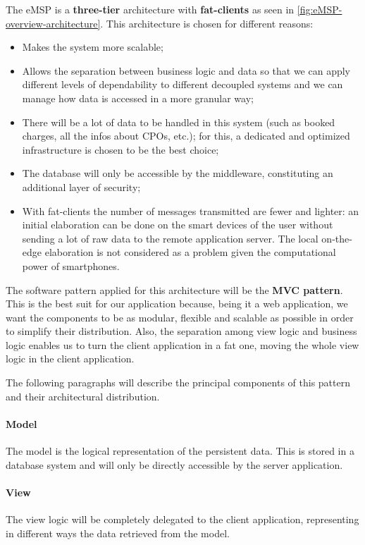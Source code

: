 The \ac{eMSP} is a \textbf{three-tier} architecture with \textbf{fat-clients} as seen in \autoref{fig:eMSP-overview-architecture}. This architecture is chosen for different reasons:
\begin{itemize}
    \item Makes the system more scalable;
    \item Allows the separation between business logic and data so that we can apply different levels of dependability to different decoupled systems and we can manage how data is accessed in a more granular way;
    \item There will be a lot of data to be handled in this system (such as booked charges, all the infos about \acp{CPO}, etc.); for this, a dedicated and optimized infrastructure is chosen to be the best choice;
    \item The database will only be accessible by the middleware, constituting an additional layer of security;
    \item With fat-clients the number of messages transmitted are fewer and lighter: an initial elaboration can be done on the smart devices of the user without sending a lot of raw data to the remote application server. The local on-the-edge elaboration is not considered as a problem given the computational power of smartphones.
\end{itemize}
The software pattern applied for this architecture will be the \textbf{\ac{MVC} pattern}. This is the best suit for our application because, being it a web application, we want the components to be as modular, flexible and scalable as possible in order to simplify their distribution.
Also, the separation among view logic and business logic enables us to turn the client application in a fat one, moving the whole view logic in the client application. 

The following paragraphs will describe the principal components of this pattern and their architectural distribution.

\paragraph{Model}
The model is the logical representation of the persistent data. This is stored in a database system and will only be directly accessible by the server application.

\paragraph{View}
The view logic will be completely delegated to the client application, representing in different ways the data retrieved from the model.

